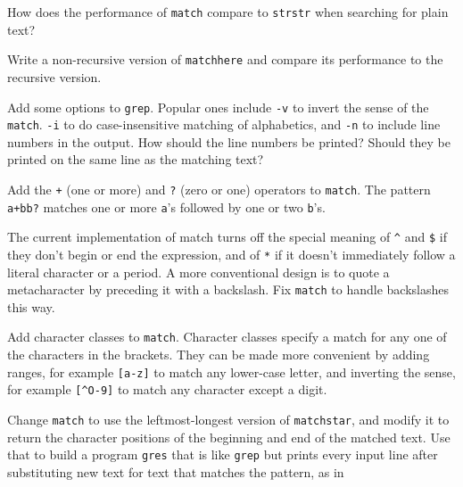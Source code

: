 \begin{exercise}
    How does the performance of \verb'match' compare to \verb'strstr' when
    searching for plain text?
\end{exercise}

\begin{exercise}
    Write a non-recursive version of \verb'matchhere' and compare its
    performance to the recursive version.
\end{exercise}

\begin{exercise}
    Add some options to \verb'grep'. Popular ones include \verb'-v' to
    invert the sense of the \verb'match'. \verb'-i' to do case-insensitive
    matching of alphabetics, and \verb'-n' to include line numbers in the
    output. How should the line numbers be printed? Should they be printed
    on the same line as the matching text?
\end{exercise}

\begin{exercise}
    Add the \verb'+' (one or more) and \verb'?' (zero or one) operators to
    \verb'match'. The pattern \verb'a+bb?' matches one or more \verb'a''s
    followed by one or two \verb'b''s.
\end{exercise}

\begin{exercise}
    The current implementation of match turns off the special meaning of
    \verb'^' and \verb'$' if they don't begin or end the expression, and of
    \verb'*' if it doesn't immediately follow a literal character or a
    period. A more conventional design is to quote a metacharacter by
    preceding it with a backslash. Fix \verb'match' to handle backslashes
    this way.
\end{exercise}

\begin{exercise}
    Add character classes to \verb'match'. Character classes specify a
    match for any one of the characters in the brackets. They can be made
    more convenient by adding ranges, for example \verb'[a-z]' to match any
    lower-case letter, and inverting the sense, for example \verb'[^O-9]'
    to match any character except a digit.
\end{exercise}

\begin{exercise}
    Change \verb'match' to use the leftmost-longest version of
    \verb'matchstar', and modify it to return the character positions of
    the beginning and end of the matched text. Use that to build a program
    \verb'gres' that is like \verb'grep' but prints every input line after
    substituting new text for text that matches the pattern, as in
    \begin{wellcode}
    \end{wellcode}
\end{exercise}

